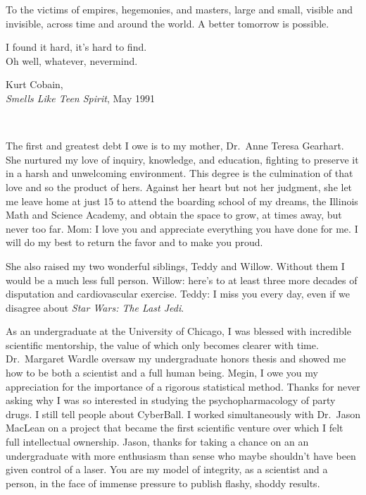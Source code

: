 \begin{frontmatter}

\begin{dedication}
\null\vfil
\begin{center}
	To the victims of empires, hegemonies, and masters,
	large and small, visible and invisible,
	across time and around the world.
	A better tomorrow is possible.\\\vspace{12pt}
\end{center}
\setlength{\epigraphwidth}{0.4\linewidth}
	\epigraph{%
	I found it hard, it's hard to find.\\
	Oh well, whatever, nevermind.}%
	{Kurt Cobain,\\\emph{Smells Like Teen Spirit}, May 1991}
\vfil\null\
\end{dedication}


\tableofcontents
\clearpage
\listoffigures
\clearpage
\listofalgorithms{}

\begin{acknowledgements}
	The first and greatest debt I owe is to my mother,
	Dr.\ Anne Teresa Gearhart.
	She nurtured my love of inquiry, knowledge, and education,
	fighting to preserve it in a harsh and unwelcoming
	environment.
	This degree is the culmination of that love
	and so the product of hers.
	Against her heart but not her judgment,
	she let me leave home at just 15
	to attend the boarding school of my dreams,
	the Illinois Math and Science Academy,
	and obtain the space to grow,
	at times away, but never too far.
	Mom: I love you and appreciate everything you have done for me.
	I will do my best to return the favor and to make you proud.

	She also raised my two wonderful siblings, Teddy and Willow.
	Without them I would be a much less full person.
	Willow: here's to at least three more decades
	of disputation and cardiovascular exercise.
	Teddy: I miss you every day,
	even if we disagree about \emph{Star Wars: The Last Jedi}.

	As an undergraduate at the University of Chicago,
	I was blessed with incredible scientific mentorship,
	the value of which only becomes clearer with time.
	Dr.\ Margaret Wardle oversaw my undergraduate
	honors thesis and showed me how to be both
	a scientist and a full human being.
	Megin, I owe you my appreciation
	for the importance of a rigorous statistical method.
	Thanks for never asking why I was so interested
	in studying the psychopharmacology of party drugs.
	I still tell people about CyberBall.
	I worked simultaneously with
	Dr.\ Jason MacLean on a project that became
	the first scientific venture over which I felt
	full intellectual ownership.
	Jason, thanks for taking a chance on an
	an undergraduate with more enthusiasm than sense
	who maybe shouldn't have been given control of a laser.
	You are my model of integrity,
	as a scientist and a person,
	in the face of immense pressure to publish
	flashy, shoddy results.


\end{acknowledgements}
\end{frontmatter}
